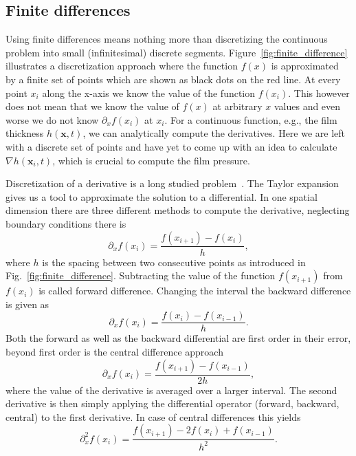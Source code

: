 \subsection{Finite differences}
Using finite differences means nothing more than discretizing the continuous problem into small (infinitesimal) discrete segments.
Figure~\ref{fig:finite_difference} illustrates a discretization approach where the function $f(x)$ is approximated by a finite set of points which are shown as black dots on the red line.
At every point $x_i$ along the x-axis we know the value of the function $f(x_i)$.
This however does not mean that we know the value of $f(x)$ at arbitrary $x$ values and even worse we do not know $\partial_x f(x_i)$ at $x_i$. 
For a continuous function, e.g., the film thickness $h(\mathbf{x},t)$, we can analytically compute the derivatives. 
Here we are left with a discrete set of points and have yet to come up with an idea to calculate $\nabla h(\mathbf{x}_i, t)$, which is crucial to compute the film pressure.

Discretization of a derivative is a long studied problem~\cite{booleTreatiseCalculusFinite1872, jordanCalculusFiniteDifferences1965}.
The Taylor expansion gives us a tool to approximate the solution to a differential.
In one spatial dimension there are three different methods to compute the derivative, neglecting boundary conditions there is
\begin{equation}\label{eq:forward_dif}
    \partial_x f(x_i) = \frac{f(x_{i+1}) - f(x_i)}{h},
\end{equation}
where $h$ is the spacing between two consecutive points as introduced in Fig.~\ref{fig:finite_difference}. 
Subtracting the value of the function $f(x_{i+1})$ from $f(x_i)$ is called forward difference.
Changing the interval the backward difference is given as
\begin{equation}\label{eq:backward_dif}
    \partial_x f(x_i) = \frac{f(x_i) - f(x_{i-1})}{h}.
\end{equation}
Both the forward as well as the backward differential are first order in their error, beyond first order is the central difference approach
\begin{equation}\label{eq:center_diff}
    \partial_x f(x_i) = \frac{f(x_{i+1}) - f(x_{i-1})}{2h},
\end{equation}
where the value of the derivative is averaged over a larger interval. 
The second derivative is then simply applying the differential operator (forward, backward, central) to  the first derivative. 
In case of central differences this yields
\begin{equation}\label{eq:second_central_diff}
    \partial_x^2 f(x_i) = \frac{f(x_{i+1})-2f(x_i)+f(x_{i-1})}{h^2}.
\end{equation}


